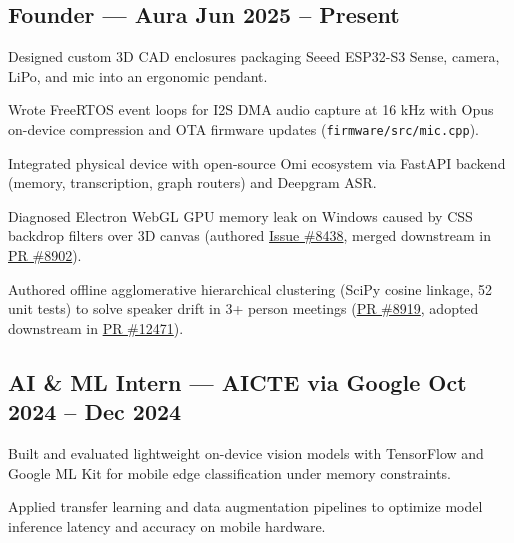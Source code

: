 
\subsection[Founder --- Aura]{{Founder} \textnormal{--- Aura} \hfill Jun 2025 -- Present}
\begin{zitemize}
\item Designed custom 3D CAD enclosures packaging Seeed ESP32-S3 Sense, camera, LiPo, and mic into an ergonomic pendant.
\item Wrote FreeRTOS event loops for I2S DMA audio capture at 16 kHz with Opus on-device compression and OTA firmware updates (\texttt{firmware/src/mic.cpp}).
\item Integrated physical device with open-source Omi ecosystem via FastAPI backend (memory, transcription, graph routers) and Deepgram ASR.
\item Diagnosed Electron WebGL GPU memory leak on Windows caused by CSS backdrop filters over 3D canvas (authored \href{https://github.com/BasedHardware/omi/issues/8438}{Issue \#8438}, merged downstream in \href{https://github.com/BasedHardware/omi/pull/8902}{PR \#8902}).
\item Authored offline agglomerative hierarchical clustering (SciPy cosine linkage, 52 unit tests) to solve speaker drift in 3+ person meetings (\href{https://github.com/BasedHardware/omi/pull/8919}{PR \#8919}, adopted downstream in \href{https://github.com/BasedHardware/omi/pull/12471}{PR \#12471}).
\end{zitemize}

\subsection[AI and ML Intern --- AICTE via Google]{{AI \& ML Intern} \textnormal{--- AICTE via Google} \hfill Oct 2024 -- Dec 2024}
\begin{zitemize}
\item Built and evaluated lightweight on-device vision models with TensorFlow and Google ML Kit for mobile edge classification under memory constraints.
\item Applied transfer learning and data augmentation pipelines to optimize model inference latency and accuracy on mobile hardware.
\end{zitemize}

